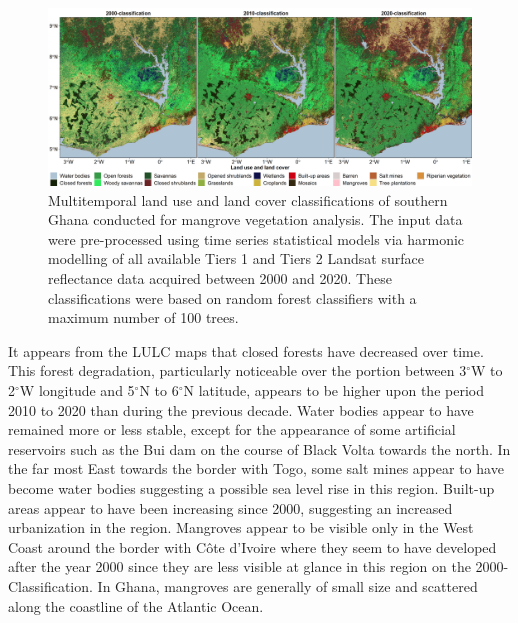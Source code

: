 \documentclass[12pt,oneside,preprint,3p,authoryear,times]{elsarticle} %
\begin{document}
\begin{figure}[!htbp]

{\centering \includegraphics[width=1\linewidth,]{figures/pngs/Ghana_classifications} 

}

\caption{Multitemporal land use and land cover classifications of southern Ghana conducted for mangrove vegetation analysis. The input data were pre-processed using time series statistical models via harmonic modelling of all available Tiers 1 and Tiers 2 Landsat surface reflectance data acquired between 2000 and 2020. These classifications were based on random forest classifiers with a maximum number of 100 trees.}\label{fig:fig5}
\end{figure}

It appears from the LULC maps that closed forests have decreased over
time. This forest degradation, particularly noticeable over the portion
between 3\(^\circ\)W to 2\(^\circ\)W longitude and 5\(^\circ\)N to
6\(^\circ\)N latitude, appears to be higher upon the period 2010 to 2020
than during the previous decade. Water bodies appear to have remained
more or less stable, except for the appearance of some artificial
reservoirs such as the Bui dam on the course of Black Volta towards the
north. In the far most East towards the border with Togo, some salt
mines appear to have become water bodies suggesting a possible sea level
rise in this region. Built-up areas appear to have been increasing since
2000, suggesting an increased urbanization in the region. Mangroves
appear to be visible only in the West Coast around the border with Côte
d'Ivoire where they seem to have developed after the year 2000 since
they are less visible at glance in this region on the
2000-Classification. In Ghana, mangroves are generally of small size and
scattered along the coastline of the Atlantic Ocean.
\end{document}
